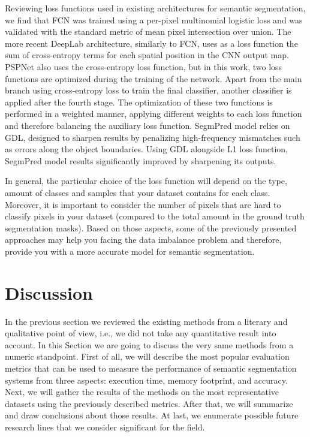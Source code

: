 Reviewing loss functions used in existing architectures for semantic segmentation, we find that \ac{FCN} \cite{Long2015} was trained using a per-pixel multinomial logistic loss and was validated with the standard metric of mean pixel intersection over union. The more recent DeepLab \cite{Chen2016} architecture, similarly to \ac{FCN}, uses as a loss function the sum of cross-entropy terms for each spatial position in the \ac{CNN} output map. PSPNet \cite{Zhao2016} also uses the cross-entropy loss function, but in this work, two loss functions are optimized during the training of the network. Apart from the main branch using cross-entropy loss to train the final classifier, another classifier is applied after the fourth stage. The optimization of these two functions is performed in a weighted manner, applying different weights to each loss function and therefore balancing the auxiliary loss function. SegmPred \cite{Luc2017} model relies on \ac{GDL}, designed to sharpen results by penalizing high-frequency mismatches such as errors along the object boundaries. Using \ac{GDL} alongside L1 loss function, SegmPred model results significantly improved by sharpening its outputs. 

In general, the particular choice of the loss function will depend on the type, amount of classes and samples that your dataset contains for each class. Moreover, it is important to consider the number of pixels that are hard to classify pixels in your dataset (compared to the total amount in the ground truth segmentation masks). Based on those aspects, some of the previously presented approaches may help you facing the data imbalance problem and therefore, provide you with a more accurate model for semantic segmentation.

\section{Discussion}
\label{cha:semseg:sec:discussion}

In the previous section we reviewed the existing methods from a literary and qualitative point of view, i.e., we did not take any quantitative result into account. In this Section we are going to discuss the very same methods from a numeric standpoint. First of all, we will describe the most popular evaluation metrics that can be used to measure the performance of semantic segmentation systems from three aspects: execution time, memory footprint, and accuracy. Next, we will gather the results of the methods on the most representative datasets using the previously described metrics. After that, we will summarize and draw conclusions about those results. At last, we enumerate possible future research lines that we consider significant for the field.

